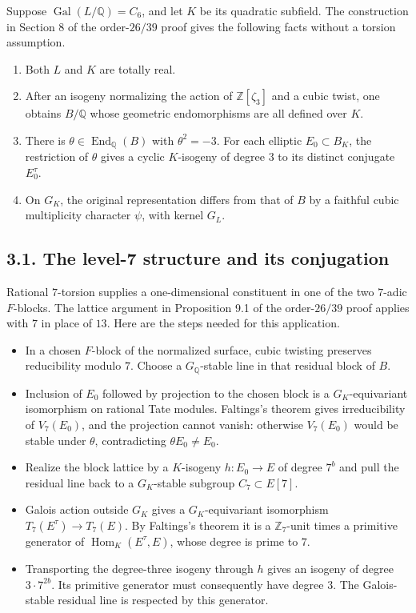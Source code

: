\documentclass[
  11pt,
]{article}
\providecommand{\tightlist}{%
  \setlength{\itemsep}{0pt}\setlength{\parskip}{0pt}}
\begin{document}
Suppose \(\operatorname{Gal}(L/\mathbb Q)=C_6\), and let \(K\) be its
quadratic subfield. The construction in Section 8 of the order-\(26/39\)
proof gives the following facts without a torsion assumption.

\begin{enumerate}
\def\labelenumi{\arabic{enumi}.}
\tightlist
\item
  Both \(L\) and \(K\) are totally real.
\item
  After an isogeny normalizing the action of \(\mathbb Z[\zeta_3]\) and
  a cubic twist, one obtains \(B/\mathbb Q\) whose geometric
  endomorphisms are all defined over \(K\).
\item
  There is \(\theta\in\operatorname{End}_{\mathbb Q}(B)\) with
  \(\theta^2=-3\). For each elliptic \(E_0\subset B_K\), the restriction
  of \(\theta\) gives a cyclic \(K\)-isogeny of degree \(3\) to its
  distinct conjugate \(E_0^\tau\).
\item
  On \(G_K\), the original representation differs from that of \(B\) by
  a faithful cubic multiplicity character \(\psi\), with kernel \(G_L\).
\end{enumerate}

\subsection{3.1. The level-7 structure and its
conjugation}\label{the-level-7-structure-and-its-conjugation}

Rational \(7\)-torsion supplies a one-dimensional constituent in one of
the two \(7\)-adic \(F\)-blocks. The lattice argument in Proposition 9.1
of the order-\(26/39\) proof applies with \(7\) in place of \(13\). Here
are the steps needed for this application.

\begin{itemize}
\tightlist
\item
  In a chosen \(F\)-block of the normalized surface, cubic twisting
  preserves reducibility modulo \(7\). Choose a \(G_{\mathbb Q}\)-stable
  line in that residual block of \(B\).
\item
  Inclusion of \(E_0\) followed by projection to the chosen block is a
  \(G_K\)-equivariant isomorphism on rational Tate modules. Faltings's
  theorem gives irreducibility of \(V_7(E_0)\), and the projection
  cannot vanish: otherwise \(V_7(E_0)\) would be stable under
  \(\theta\), contradicting \(\theta E_0\ne E_0\).
\item
  Realize the block lattice by a \(K\)-isogeny \(h:E_0\to E\) of degree
  \(7^b\) and pull the residual line back to a \(G_K\)-stable subgroup
  \(C_7\subset E[7]\).
\item
  Galois action outside \(G_K\) gives a \(G_K\)-equivariant isomorphism
  \(T_7(E^\tau)\to T_7(E)\). By Faltings's theorem it is a
  \(\mathbb Z_7\)-unit times a primitive generator of
  \(\operatorname{Hom}_K(E^\tau,E)\), whose degree is prime to \(7\).
\item
  Transporting the degree-three isogeny through \(h\) gives an isogeny
  of degree \(3\cdot7^{2b}\). Its primitive generator must consequently
  have degree \(3\). The Galois-stable residual line is respected by
  this generator.
\end{itemize}
\end{document}
